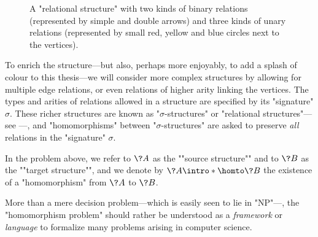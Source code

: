 \begin{figure}
	\caption{
		\AP\label{fig:example-structure-homomorphism}
		A "relational structure" with two kinds of binary relations (represented by
		simple and double arrows) and three kinds of unary relations (represented by
		small red, yellow and blue circles next to the vertices).
	}
\end{figure}
To enrich the structure---but also, perhaps more enjoyably,
to add a splash of colour to this thesis---we will consider more complex structures
by allowing for multiple edge relations, or even relations of higher arity linking the vertices.
The types and arities of relations allowed in a structure are specified by its "signature" $\sigma$.
These richer structures are known as "$\sigma$-structures" or "relational structures"---see
---, and
"homomorphisms" between "$\sigma$-structures" are asked to preserve \emph{all} relations
in the "signature" $\sigma$.


In the problem above, we refer to $\?A$ as the \AP""source structure""
and to $\?B$ as the ""target structure"", and we denote by \AP$\?A \intro*\homto \?B$
the existence of a "homomorphism" from $\?A$ to $\?B$.

More than a mere decision problem---which is easily seen to lie in "NP"---,
the "homomorphism problem" should rather be understood as a \emph{framework} or
\emph{language} to formalize many problems arising in computer science.


